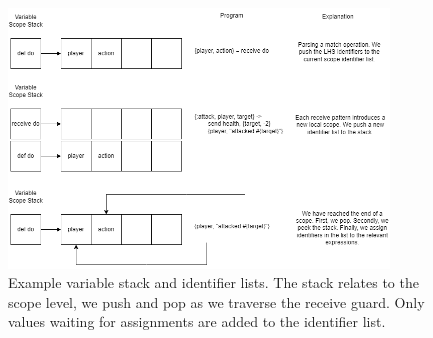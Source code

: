 \begin{figure}[h]
    \centering
    \includegraphics[width=0.9\textwidth]{images/var_stack.drawio.png}
    \caption{Example variable stack and identifier lists. The stack relates to the scope level, we push and pop as we traverse the receive guard. Only values waiting for assignments are added to the identifier list.}
    \label{fig:scope_hierarchy2}
\end{figure}
